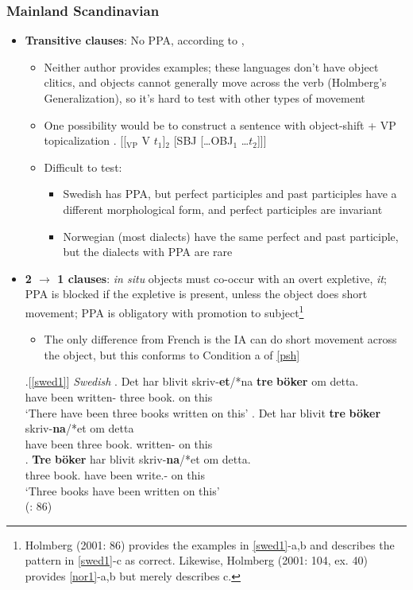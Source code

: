 \documentclass[letterpaper,10pt]{handout_nick}
\begin{document}
\subsubsection{Mainland Scandinavian}
\begin{itemize}
\item {\bf Transitive clauses}: No PPA, according to \citet{christensen89}, \citet{holmberg01} 
\begin{itemize}
\item Neither author provides examples; these languages don't have object clitics, and objects cannot generally move across the verb (Holmberg's Generalization), so it's hard to test with other types of movement
\item One possibility would be to construct a sentence with object-shift + VP topicalization
\ex. [[$_\text{VP}$ V $t_1$]$_2$ [SBJ [\ldots OBJ$_1$ \ldots $t_2$]]]

\item Difficult to test: 
\begin{itemize}
\item Swedish has PPA, but perfect participles and past participles have a different morphological form, and perfect participles are invariant
\item Norwegian (most dialects) have the same perfect and past participle, but the dialects with PPA are rare
\end{itemize}
\end{itemize}
\item {\bf 2 $\rightarrow$ 1 clauses}: \emph{in situ} objects must co-occur with an overt expletive, \emph{it}; PPA is blocked if the expletive is present, unless the object does short movement; PPA is obligatory with promotion to subject\footnote{Holmberg (2001: 86) provides the examples in \ref{swed1}-a,b and describes the pattern in \ref{swed1}-c as correct. Likewise,  
Holmberg (2001: 104, ex. 40) provides \ref{nor1}-a,b but merely describes c.} 
\begin{itemize}
\item The only difference from French is the IA can do short movement across the object, but this conforms to Condition a of \ref{psh}
\end{itemize}
\ex.[\ref{swed1}] \emph{Swedish} 
\ag. Det har blivit skriv-{\bf et}/*na {\bf tre} {\bf b\"oker} om detta.\\
 have been written- three book. on this\\
`There have been three books written on this'
\bg. Det har blivit {\bf tre} {\bf b\"oker} skriv-{\bf na}/*et om detta\\
 have been three book. written- on this\\
\bg. {\bf Tre} {\bf b\"oker} har blivit skriv-{\bf na}/*et om detta.\\
three book. have been write.- on this\\
`Three books have been written on this'\\
(\citealt{holmberg01}: 86)


\end{itemize}
\end{document}
